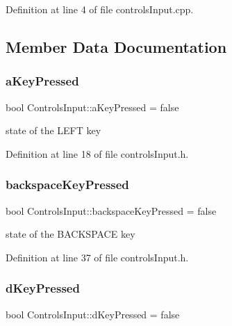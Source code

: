 Definition at line 4 of file controls\+Input.\+cpp.



\subsection{Member Data Documentation}
\mbox{\label{struct_controls_input_a3d2a78cb660f43a9aec0cc2eff4102dd}} 
\subsubsection{\texorpdfstring{a\+Key\+Pressed}{aKeyPressed}}
{\footnotesize\ttfamily bool Controls\+Input\+::a\+Key\+Pressed = false}

state of the L\+E\+FT key 

Definition at line 18 of file controls\+Input.\+h.

\mbox{\label{struct_controls_input_a5a220f2b624d21ac3ccb2f776a593305}} 
\subsubsection{\texorpdfstring{backspace\+Key\+Pressed}{backspaceKeyPressed}}
{\footnotesize\ttfamily bool Controls\+Input\+::backspace\+Key\+Pressed = false}

state of the B\+A\+C\+K\+S\+P\+A\+CE key 

Definition at line 37 of file controls\+Input.\+h.

\mbox{\label{struct_controls_input_a6ce83f226b91636c1fd39990b58f392a}} 
\subsubsection{\texorpdfstring{d\+Key\+Pressed}{dKeyPressed}}
{\footnotesize\ttfamily bool Controls\+Input\+::d\+Key\+Pressed = false}

